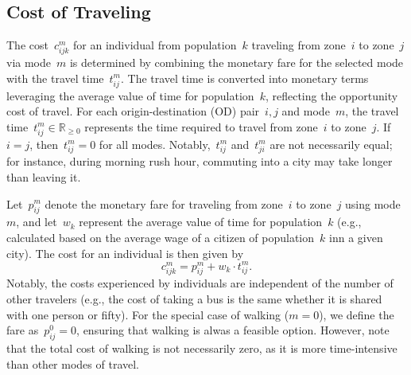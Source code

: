\subsection{Cost of Traveling}
The cost~$c_{ijk}^m$ for an individual from population~$k$ traveling from zone~$i$ to zone~$j$ via mode~$m$ is determined by combining the monetary fare for the selected mode with the travel time~$t_{ij}^m$.
The travel time is converted into monetary terms leveraging the average value of time for population~$k$, reflecting the opportunity cost of travel.
For each origin-destination (OD) pair~$i,j$ and mode~$m$, the travel time~$t_{ij}^m \in \mathbb{R}_{\geq 0}$ represents the time required to travel from zone~$i$ to zone~$j$.
If~$i=j$, then~$t_{ij}^m=0$ for all modes.
Notably,~$t_{ij}^m$ and~$t_{ji}^m$ are not necessarily equal; for instance, during morning rush hour, commuting into a city may take longer than leaving it.

\noindent Let~$p_{ij}^m$ denote the monetary fare for traveling from zone~$i$ to zone~$j$ using mode~$m$, and let~$w_k$ represent the average value of time for population~$k$ (e.g., calculated based on the average wage of a citizen of population~$k$ inn a given city).
The cost for an individual is then given by
\begin{equation}\label{cost fxn}
    c_{ijk}^m = p_{ij}^m + w_k \cdot t_{ij}^m.
\end{equation}
Notably, the costs experienced by individuals are independent of the number of other travelers (e.g., the cost of taking a bus is the same whether it is shared with one person or fifty).
For the special case of walking ($m=0$), we define the fare as~$p_{ij}^0=0$, ensuring that walking is alwas a feasible option.
However, note that the total cost of walking is not necessarily zero, as it is more time-intensive than other modes of travel.

